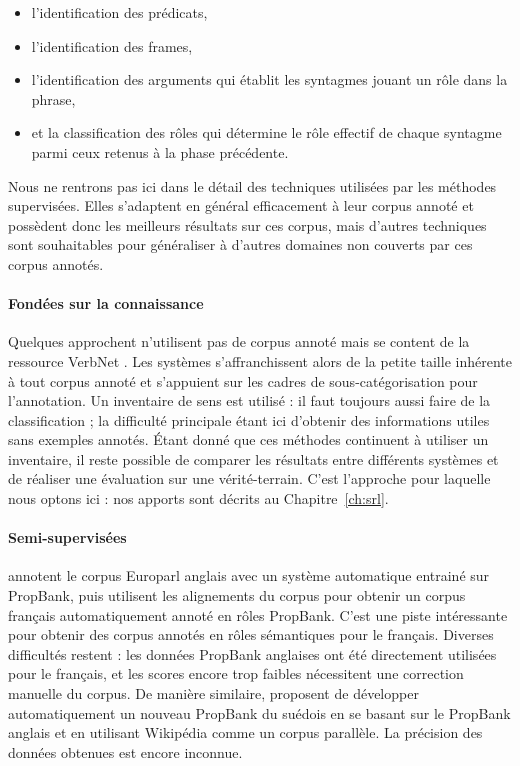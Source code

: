 \begin{itemize}
    \item l'identification des prédicats,
    \item l'identification des frames,
    \item l'identification des arguments qui établit les syntagmes jouant un rôle dans la phrase,
    \item et la classification des rôles qui détermine le rôle effectif de
chaque syntagme parmi ceux retenus à la phase précédente.
\end{itemize}

Nous ne rentrons pas ici dans le détail des techniques utilisées par les
méthodes supervisées. Elles s'adaptent en général efficacement à leur corpus
annoté et possèdent donc les meilleurs résultats sur ces corpus, mais d'autres
techniques sont souhaitables pour généraliser à d'autres domaines non couverts
par ces corpus annotés.


\paragraph{Fondées sur la connaissance}

Quelques approchent n'utilisent pas de corpus annoté mais se content de la
ressource VerbNet
\citep{swier2004unsupervised,swier2005exploiting,pradet2013revisiting}. Les
systèmes s'affranchissent alors de la petite taille inhérente à tout corpus
annoté et s'appuient sur les cadres de sous-catégorisation pour l'annotation.
Un inventaire de sens est utilisé : il faut toujours aussi faire de la
classification ; la difficulté principale étant ici d'obtenir des informations
utiles sans exemples annotés. Étant donné que ces méthodes continuent à
utiliser un inventaire, il reste possible de comparer les résultats entre
différents systèmes et de réaliser une évaluation sur une vérité-terrain. C'est
l'approche pour laquelle nous optons ici : nos apports sont décrits au
Chapitre~\ref{ch:srl}.

\paragraph{Semi-supervisées}

\cite{vanderplas2014cross} annotent le corpus Europarl anglais avec un système
automatique entrainé sur PropBank, puis utilisent les alignements du corpus
pour obtenir un corpus français automatiquement annoté en rôles PropBank. C'est
une piste intéressante pour obtenir des corpus annotés en rôles sémantiques
pour le français. Diverses difficultés restent : les données PropBank anglaises
ont été directement utilisées pour le français, et les scores encore trop
faibles nécessitent une correction manuelle du corpus. De manière similaire,
\cite{exner2014using} proposent de développer automatiquement un nouveau
PropBank du suédois en se basant sur le PropBank anglais et en utilisant
Wikipédia comme un corpus parallèle. La précision des données obtenues est
encore inconnue.

